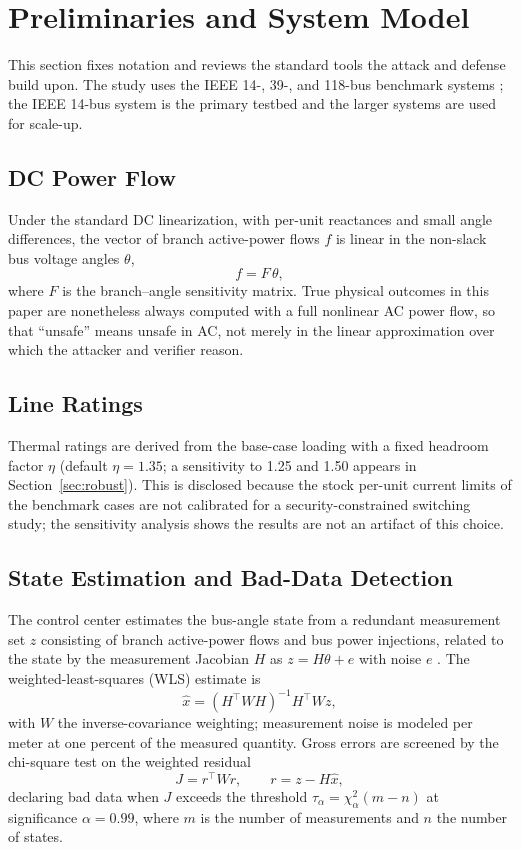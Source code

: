 \documentclass{ieeeaccess}
\begin{document}
\section{Preliminaries and System Model}\label{sec:prelim}
This section fixes notation and reviews the standard tools the attack and defense build upon. The study uses the IEEE 14-, 39-, and 118-bus benchmark systems \cite{pandapower}; the IEEE 14-bus system is the primary testbed and the larger systems are used for scale-up.

\subsection{DC Power Flow}
Under the standard DC linearization, with per-unit reactances and small angle differences, the vector of branch active-power flows $f$ is linear in the non-slack bus voltage angles $\theta$,
\begin{equation}
f = F\,\theta,
\end{equation}
where $F$ is the branch--angle sensitivity matrix. True physical outcomes in this paper are nonetheless always computed with a full nonlinear AC power flow, so that ``unsafe'' means unsafe in AC, not merely in the linear approximation over which the attacker and verifier reason.

\subsection{Line Ratings}
Thermal ratings are derived from the base-case loading with a fixed headroom factor $\eta$ (default $\eta=1.35$; a sensitivity to 1.25 and 1.50 appears in Section~\ref{sec:robust}). This is disclosed because the stock per-unit current limits of the benchmark cases are not calibrated for a security-constrained switching study; the sensitivity analysis shows the results are not an artifact of this choice.

\subsection{State Estimation and Bad-Data Detection}
The control center estimates the bus-angle state from a redundant measurement set $z$ consisting of branch active-power flows and bus power injections, related to the state by the measurement Jacobian $H$ as $z = H\theta + e$ with noise $e$ \cite{abur,monticelli}. The weighted-least-squares (WLS) estimate is
\begin{equation}
\hat{x} = (H^{\top} W H)^{-1} H^{\top} W z,
\end{equation}
with $W$ the inverse-covariance weighting; measurement noise is modeled per meter at one percent of the measured quantity. Gross errors are screened by the chi-square test on the weighted residual
\begin{equation}
J = r^{\top} W r,\qquad r = z - H\hat{x},
\end{equation}
declaring bad data when $J$ exceeds the threshold $\tau_\alpha=\chi^2_{\alpha}(m-n)$ at significance $\alpha=0.99$, where $m$ is the number of measurements and $n$ the number of states.
\end{document}
